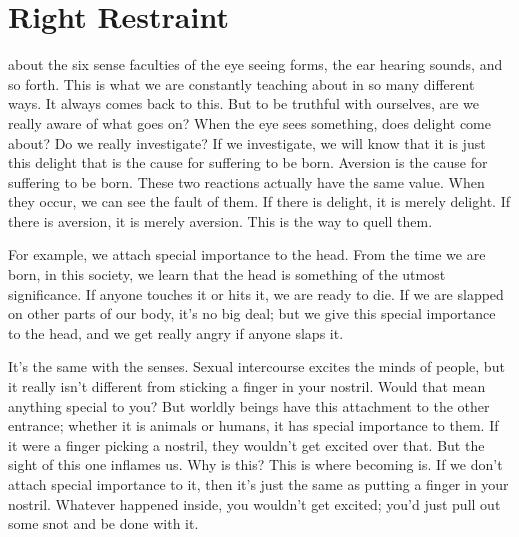 
\renewcommand{\chapterFootnotemark}{\footnotemark}
\renewcommand{\chapterFootnotetext}{\footnotetext{\textit{Note}: The latter half of this talk has been published elsewhere under the title: `\textit{Listening Beyond Words}'}}

\chapter{Right Restraint}

 about the six sense faculties of the eye seeing forms, the ear hearing sounds, and so forth. This is what we are constantly teaching about in so many different ways. It always comes back to this. But to be truthful with ourselves, are we really aware of what goes on? When the eye sees something, does delight come about? Do we really investigate? If we investigate, we will know that it is just this delight that is the cause for suffering to be born. Aversion is the cause for suffering to be born. These two reactions actually have the same value. When they occur, we can see the fault of them. If there is delight, it is merely delight. If there is aversion, it is merely aversion. This is the way to quell them.

For example, we attach special importance to the head. From the time we are born, in this society, we learn that the head is something of the utmost significance. If anyone touches it or hits it, we are ready to die. If we are slapped on other parts of our body, it's no big deal; but we give this special importance to the head, and we get really angry if anyone slaps it.

It's the same with the senses. Sexual intercourse excites the minds of people, but it really isn't different from sticking a finger in your nostril. Would that mean anything special to you? But worldly beings have this attachment to the other entrance; whether it is animals or humans, it has special importance to them. If it were a finger picking a nostril, they wouldn't get excited over that. But the sight of this one inflames us. Why is this? This is where becoming is. If we don't attach special importance to it, then it's just the same as putting a finger in your nostril. Whatever happened inside, you wouldn't get excited; you'd just pull out some snot and be done with it.

